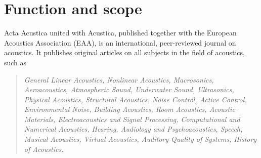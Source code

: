 \documentclass[twoside,twocolumn]{article}
\begin{document}
  
\PACS{43 \dots}
  \Heft{}  \Letzteseite{}



 \Germanorfrenchtitle{}


\Germanorfrenchabstract{}

\ScientificPaper

\section{Function and scope}

Acta Acustica united with Acustica, published together with the European
Acoustics Association (EAA), is an international, peer-reviewed journal
on acoustics. It publishes original articles on all subjects in the
field of acoustics, such as

\begin{quote}\em
General Linear Acoustics, Nonlinear Acoustics, Macrosonics,
Aeroacoustics, Atmospheric Sound, Underwater Sound, Ultrasonics,
Physical Acoustics, Structural Acoustics, Noise Control, Active Control,
Environmental Noise, Building Acoustics, Room Acoustics, Acoustic
Materials, Electroacoustics and Signal Processing, Computational and
Numerical Acoustics, Hearing, Audiology and Psychoacoustics, Speech,
Musical Acoustics, Virtual Acoustics, Auditory Quality of Systems,
History of Acoustics.
\end{quote}
\end{document}
